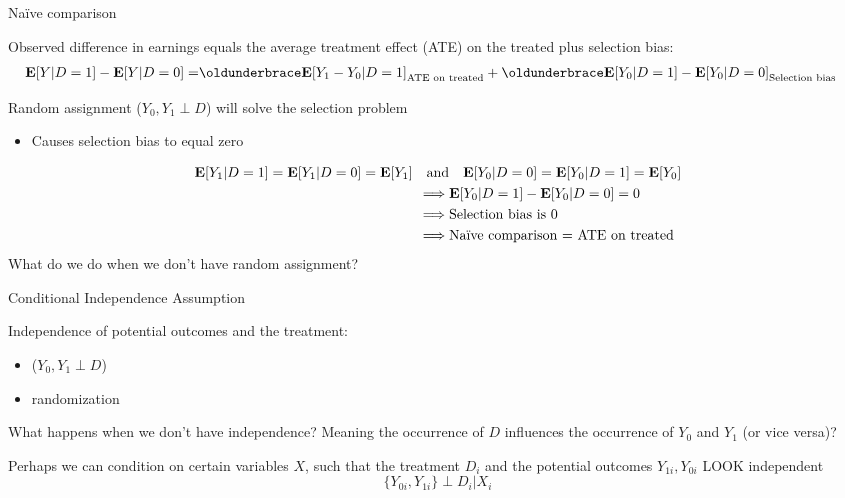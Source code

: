 \documentclass[compress, 8pt]{beamer}
\begin{document}
\begin{frame}{Na{\"i}ve comparison}

Observed difference in earnings equals the average treatment effect (ATE) on the treated plus selection bias:
\begin{align*}
\EE [Y \vert D = 1] - \EE [Y \vert D=0] 
=& \underbrace{\EE [Y_1 - Y_0 \vert D = 1]}_{\text{ATE on treated}} 
+ \underbrace{\EE [Y_0 \vert D = 1] - \EE [Y_0 \vert D=0]}_{\text{Selection bias}}
\end{align*}

Random assignment ($Y_0, Y_1 \perp D$) will solve the selection problem
\begin{itemize}
    \item Causes selection bias to equal zero
\end{itemize}
\begin{align*}
    \mathbf{E} [Y_1 \vert D = 1] = \mathbf{E}[Y_1 \vert D = 0] = \mathbf{E} [Y_1] \quad
    \text{and}& \quad \mathbf{E} [Y_0 \vert D = 0] = \mathbf{E} [Y_0 \vert D = 1] = \mathbf{E} [Y_0] \\
    \implies&
    \mathbf{E} [Y_0 \vert D = 1] - \mathbf{E} [Y_0 \vert D = 0] = 0 \\
    \implies&
    \text{Selection bias is 0} \\
    \implies&
    \text{Na{\"i}ve comparison = ATE on treated}
\end{align*}
What do we do when we don't have random assignment?

\end{frame}

\begin{frame}{Conditional Independence Assumption}

Independence of potential outcomes and the treatment:
\begin{itemize}
     \item [$\implies$] ($Y_0, Y_1 \perp D$)
     \item [$\implies$] randomization
\end{itemize} 
What happens when we don't have independence? Meaning the occurrence of $D$ influences the occurrence of $Y_0$ and $Y_1$ (or vice versa)?

\vspace{3ex}
Perhaps we can condition on certain variables $X$, such that the treatment $D_i$ and the potential outcomes $Y_{1i}, Y_{0i}$ LOOK independent
\begin{equation*}
    \{Y_{0i}, Y_{1i}\} \perp D_i \vert X_i
\end{equation*}

\vspace{3ex}

\end{frame}
\end{document}
